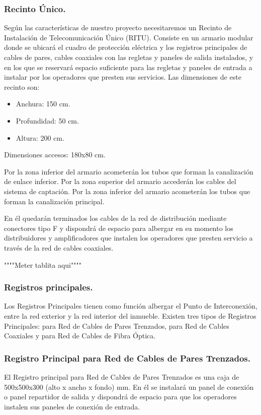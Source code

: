 \subsubsection{Recinto Único.}
Según las características de nuestro proyecto necesitaremos un Recinto de Instalación de Telecomunicación Único (RITU). Consiste en un armario modular donde se ubicará el cuadro de protección eléctrica y los registros principales de cables de pares, cables coaxiales con las regletas y paneles de salida instalados, y en los que se reservará espacio suficiente para las regletas y paneles de entrada a instalar por los operadores que presten sus servicios.
Las dimensiones de este recinto son:

\begin{itemize}
	\item Anchura: 150 cm.
	\item Profundidad: 50 cm.
	\item Altura: 200 cm.
\end{itemize}
Dimensiones accesos: 180x80 cm.

Por la zona inferior del armario acometerán los tubos que forman la canalización de enlace inferior.
Por la zona superior del armario accederán los cables del sistema de captación.
Por la zona inferior del armario acometerán los tubos que forman la canalización principal.

En él quedarán terminados los cables de la red de distribución mediante conectores tipo F y dispondrá de espacio para albergar en su momento los distribuidores y amplificadores que instalen los operadores que presten servicio a través de la red de cables coaxiales.

""""Meter tablita aqui""""

\subsubsection{Registros principales.}
Los Registros Principales tienen como función albergar el Punto de Interconexión, entre la red exterior y la red interior del inmueble.
Existen tres tipos de Registros Principales: para Red de Cables de Pares Trenzados, para Red de Cables Coaxiales y para Red de Cables de Fibra Óptica.

\subsubsection*{Registro Principal para Red de Cables de Pares Trenzados.}
El Registro principal para Red de Cables de Pares Trenzados es una caja de 500x500x300 (alto x ancho x fondo) mm.
En él se instalará un panel de conexión o panel repartidor de salida y dispondrá de espacio para que los operadores instalen sus paneles de conexión de entrada.

